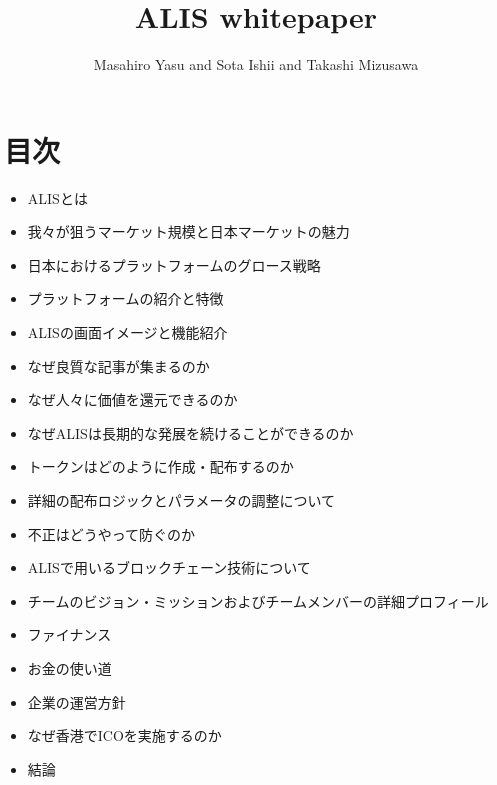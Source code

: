 \documentclass{jsarticle}
\begin{document}
\title{ALIS whitepaper}
\author{Masahiro Yasu and Sota Ishii and Takashi Mizusawa}
\maketitle

\section{目次}
\begin{itemize}
	\item ALISとは
	\item 我々が狙うマーケット規模と日本マーケットの魅力
	\item 日本におけるプラットフォームのグロース戦略
	\item プラットフォームの紹介と特徴
	\item ALISの画面イメージと機能紹介
	\item なぜ良質な記事が集まるのか
	\item なぜ人々に価値を還元できるのか
	\item なぜALISは長期的な発展を続けることができるのか
	\item トークンはどのように作成・配布するのか
	\item 詳細の配布ロジックとパラメータの調整について
	\item 不正はどうやって防ぐのか
	\item ALISで用いるブロックチェーン技術について
	\item チームのビジョン・ミッションおよびチームメンバーの詳細プロフィール
	\item ファイナンス
	\item お金の使い道
	\item 企業の運営方針
	\item なぜ香港でICOを実施するのか
	\item 結論
\end{itemize}
\end{document}
